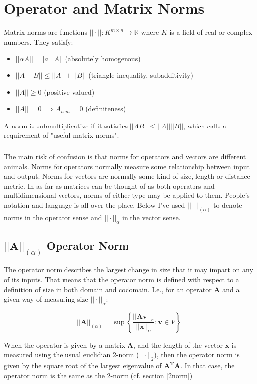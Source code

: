 \section{Operator and Matrix Norms}

Matrix norms are functions $||\cdot||: K^{m\times n} \rightarrow \mathbb{R}$ where $K$ is a field of real or complex numbers. They satisfy:

\begin{itemize}
\item $||\alpha A|| = |a| ||A||$ (absolutely homogenous)
\item $||A+B|| \leq ||A|| + ||B||$ (triangle inequality, subadditivity)
\item $||A||\geq 0$ (positive valued)
\item $||A||=0 \implies A_{n,m}=0$ (definiteness)
\end{itemize}

A norm is submultiplicative if it satisfies $||AB||\leq||A||||B||$, which  calls a requirement of "useful matrix norms".

\subparagraph{} 
The main risk of confusion is that norms for operators and vectors are different animals. Norms for operators normally measure some relationship between input and output. Norms for vectors are normally some kind of size, length or distance metric. In as far as matrices can be thought of as both operators and multidimensional vectors, norms of either type may be applied to them. People's notation and language is all over the place. Below I've used $||\cdot||_{(\alpha)}$ to denote norms in the operator sense and $||\cdot||_{\alpha}$ in the vector sense. 

\subsection{$||\mathbf{A}||_{(\alpha)}$ Operator Norm}
The operator norm describes the largest change in size that it may impart on any of its inputs. That means that the operator norm is defined with respect to a definition of size in both domain and codomain. I.e., for an operator $\mathbf{A}$ and a given way of measuring size $||\cdot||_{\alpha}$:

\begin{equation}
||\mathbf{A}||_{(\alpha)} = \sup\left\{\frac{||\mathbf{A}\mathbf{v}||_{\alpha}}{||\mathbf{x}||_{\alpha}}: \mathbf{v} \in V\right\}
\end{equation}

When the operator is given by a matrix $\mathbf{A}$, and the length of the vector $\mathbf{x}$ is measured using the usual euclidian 2-norm ($||\cdot||_{2}$), then the operator norm is given by the square root of the largest eigenvalue of $\mathbf{A^T A}$. In that case, the operator norm is the same as the 2-norm (cf. section \ref{2norm}).

